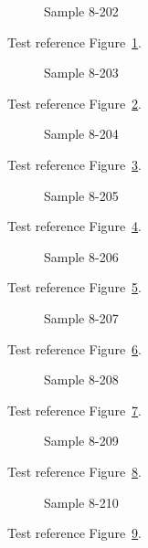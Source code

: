 \begin{figure}[tbhp]
\caption{Sample 8-202}
\label{fig:sample-8-202}
\end{figure}

Test reference Figure~\ref{fig:sample-8-202}.

\begin{figure}[tbhp]
\caption{Sample 8-203}
\label{fig:sample-8-203}
\end{figure}

Test reference Figure~\ref{fig:sample-8-203}.

\begin{figure}[tbhp]
\caption{Sample 8-204}
\label{fig:sample-8-204}
\end{figure}

Test reference Figure~\ref{fig:sample-8-204}.

\begin{figure}[tbhp]
\caption{Sample 8-205}
\label{fig:sample-8-205}
\end{figure}

Test reference Figure~\ref{fig:sample-8-205}.

\begin{figure}[tbhp]
\caption{Sample 8-206}
\label{fig:sample-8-206}
\end{figure}

Test reference Figure~\ref{fig:sample-8-206}.

\begin{figure}[tbhp]
\caption{Sample 8-207}
\label{fig:sample-8-207}
\end{figure}

Test reference Figure~\ref{fig:sample-8-207}.

\begin{figure}[tbhp]
\caption{Sample 8-208}
\label{fig:sample-8-208}
\end{figure}

Test reference Figure~\ref{fig:sample-8-208}.

\begin{figure}[tbhp]
\caption{Sample 8-209}
\label{fig:sample-8-209}
\end{figure}

Test reference Figure~\ref{fig:sample-8-209}.

\begin{figure}[tbhp]
\caption{Sample 8-210}
\label{fig:sample-8-210}
\end{figure}

Test reference Figure~\ref{fig:sample-8-210}.


